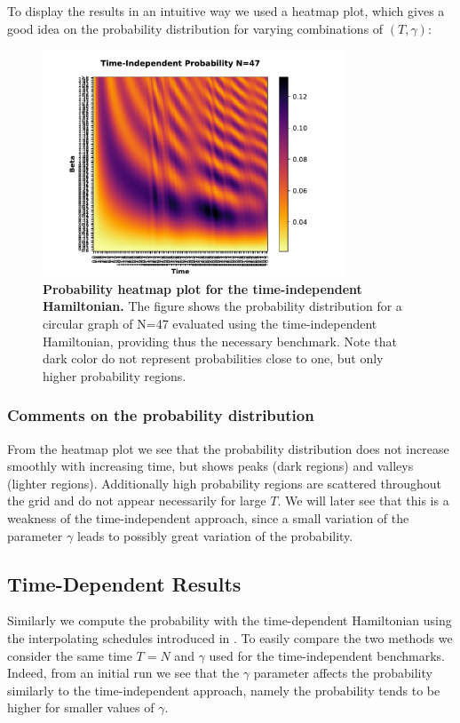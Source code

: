         To display the results in an intuitive way we used a heatmap plot, which gives a good idea on the probability distribution for varying combinations of $(T,\gamma)$: \\
          \begin{figure}[ht]
            \centering
            \includegraphics[width=9cm]{./figures/time_independent_benchmark_47}%
            \caption[Probability heatmap plot for the time-independent Hamiltonian, N=47]{\textbf{Probability heatmap plot for the time-independent Hamiltonian.} The figure shows the probability distribution for a circular graph of N=47 evaluated using the time-independent Hamiltonian, providing thus the necessary benchmark. Note that dark color do not represent probabilities close to one, but only higher probability regions.}
            \label{fig:heamap-independent}
          \end{figure}

        \subsubsection*{Comments on the probability distribution}
        From the heatmap plot we see that the probability distribution does not increase smoothly with increasing time, but shows peaks (dark regions) and valleys (lighter regions). Additionally high probability regions are scattered throughout the grid and do not appear necessarily for large $T$. We will later see that this is a weakness of the time-independent approach, since a small variation of the parameter $\gamma$ leads to possibly great variation of the probability.

    \subsection{Time-Dependent Results}\label{subsec:time_dependent_results}
        Similarly we compute the probability with the time-dependent Hamiltonian using the interpolating schedules introduced in . To easily compare the two methods we consider the same time $T=N$ and $\gamma$ used for the time-independent benchmarks. Indeed, from an initial run we see that the $\gamma$ parameter affects the probability similarly to the time-independent approach, namely the probability tends to be higher for smaller values of $\gamma$. \\

